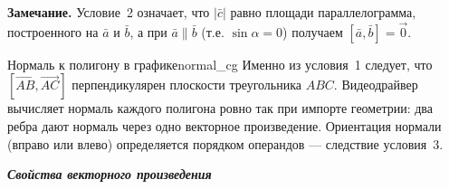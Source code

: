 \documentclass[12pt,a4paper]{article}
\newcommand{\va}{\bar{a}}
\newcommand{\vb}{\bar{b}}
\newcommand{\vc}{\bar{c}}
\begin{document}
\noindent
\textbf{Замечание.} Условие~2 означает, что $|\vc|$ равно площади
параллелограмма, построенного на $\va$ и $\vb$, а при $\va \parallel
\vb$ (т.е. $\sin\alpha = 0$) получаем $[\va,\vb] = \vec{0}$.

\begin{remarkIT}{Нормаль к полигону в графике}{normal_cg}
  Именно из условия~1 следует, что $[\overrightarrow{AB},
  \overrightarrow{AC}]$ перпендикулярен плоскости треугольника $ABC$.
  Видеодрайвер вычисляет нормаль каждого полигона ровно так при
  импорте геометрии: два ребра дают нормаль через одно векторное
  произведение. Ориентация нормали (вправо или влево) определяется
  порядком операндов --- следствие условия~3.
\end{remarkIT}

\medskip

\textbf{\textit{Свойства векторного произведения}}
\end{document}
